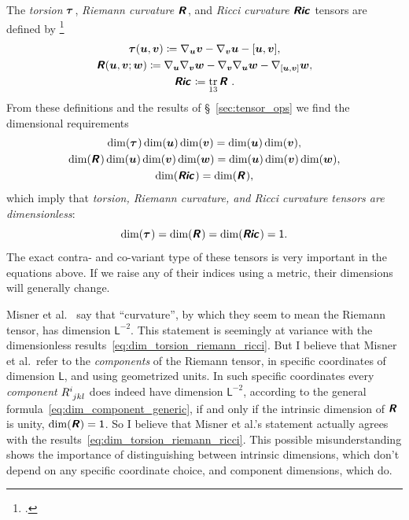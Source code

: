 \documentclass[\ifafour a4paper,12pt,\else a5paper,10pt,\fi%
onecolumn,oneside,article,%
british%
]{memoir}
\makeatletter
\theoremstyle{remark}
\theoremstyle{innote}
\newcommand*{\mathte}[1]{\textbf{\textit{\textsf{#1}}}}
\newcommand*{\citep}{\footcites}
\newcommand*{\citey}{\parencites*}%
\DeclareMathOperator{\tr}{tr}%
\newcommand*{\defd}{\coloneqq}
\DeclarePairedDelimiter\clcl{[}{]}
\renewcommand*{\|}[1][]{\nonscript\,#1\vert\nonscript\;\mathopen{}}
\newcommand*{\sect}{\S}%
\newcommand*{\etal}{{et al.}}
\newcommand*{\q}{}%
\DeclareRobustCommand*{\q}{%
  \mathbin{\mathpalette\bigcdot@{}}%
}
\newcommand*{\bigcdot@scalefactor}{0.75}
\newcommand*{\bigcdot@widthfactor}{1.5}
\newcommand*{\bigcdot@}[2]{%
  \sbox0{$#1\vcenter{}$}%
  \sbox2{$#1\cdot\m@th$}%
  \hbox to \bigcdot@widthfactor\wd2{%
    \hfil
    \raise\ht0\hbox{%
      \scalebox{\bigcdot@scalefactor}{%
        \lower\ht0\hbox{$#1\bullet\m@th$}%
      }%
    }%
    \hfil
  }%
}
\newcommand*{\Un}{\textsf{1}}
\newcommand*{\Le}{\textsf{L}}
\newcommand*{\yR}{\mathte{R}}
\newcommand*{\yRi}{\mathte{Ric}}
\newcommand*{\yTo}{\bm{\tau}}
\newcommand*{\yv}{\bm{v}}
\newcommand*{\yu}{\bm{u}}
\newcommand*{\yw}{\bm{w}}
\renewcommand*{\i}{\indices}
\newcommand*{\nab}{\nabla}
\makeatother
\begin{document}
The \emph{torsion} $\yTo\i{^{\q}_{\q\q}}$, \emph{Riemann
  curvature} $\yR\i{^{\q}_{\q\q\q}}$, and \emph{Ricci
  curvature} $\yRi\i{_{\q\q}}$ tensors are defined by
\citep[\sect~V.B.1]{choquetbruhatetal1977_r1996}
\begin{gather}
  \label{eq:torsion_eq}
\yTo(\yu,\yv) \defd \nab_{\yu}\yv - \nab_{\yv}\yu - \clcl{\yu,\yv},
\\
\yR(\yu,\yv;\yw) \defd
\nab_{\yu}\nab_{\yv}\yw - \nab_{\yv}\nab_{\yu}\yw
- \nab_{\clcl{\yu,\yv}}\yw,
  \label{eq:riemann_eq}  
\\
\yRi\i{_{\q\q}} \defd \tr_{13} \yR\i{^{\q}_{\q\q\q}} \;.
  \label{eq:ricci_eq}  
\end{gather}
From these definitions and the results of \sect~\ref{sec:tensor_ops} we
find the dimensional requirements
\begin{gather}
  \label{eq:torsion_eq_dim}
\dim(\yTo\i{^{\q}_{\q\q}})\dim(\yu)\dim(\yv) = \dim(\yu) \dim(\yv),
\\
\dim(\yR\i{^{\q}_{\q\q\q}})\dim(\yu)\dim(\yv)\dim(\yw) =
\dim(\yu)\dim(\yv)\dim(\yw),
\label{eq:riemann_eq_dim}
\\
\dim(\yRi\i{_{\q\q}}) = \dim(\yR\i{^{\q}_{\q\q\q}}),
  \label{eq:ricci_eq_dim}  
\end{gather}
which imply that \emph{torsion, Riemann curvature, and Ricci curvature
  tensors are dimensionless}:
\begin{equation}
  \label{eq:dim_torsion_riemann_ricci}
  \dim(\yTo\i{^{\q}_{\q\q}}) =
   \dim(\yR\i{^{\q}_{\q\q\q}}) =
   \dim(\yRi\i{_{\q\q}}) =\Un.
\end{equation}
The exact contra- and co-variant type of these tensors is very important in
the equations above. If we raise any of their indices using a metric, their
dimensions will generally change.

Misner \etal\ \citey[p.~35%
]{misneretal1970_r1973} say that \enquote{curvature}, by which they seem to
mean the Riemann tensor, has dimension $\Le^{-2}$. This statement is
seemingly at variance with the dimensionless
results~\eqref{eq:dim_torsion_riemann_ricci}. But I believe that Misner
\etal\ refer to the \emph{components} of the Riemann tensor, in specific
coordinates of dimension $\Le$, and using geometrized units. In such
specific coordinates every \emph{component} $R\i{^{i}_{jkl}}$ does indeed
have dimension $\Le^{-2}$, according to the general
formula~\eqref{eq:dim_component_generic}, if and only if the intrinsic
dimension of $\yR$ is unity, $\dim(\yR)=\Un$. So I believe that Misner
\etal's statement actually agrees with the
results~\eqref{eq:dim_torsion_riemann_ricci}. This possible
misunderstanding shows the importance of distinguishing between intrinsic
dimensions, which don't depend on any specific coordinate choice, and
component dimensions, which do.
\end{document}
